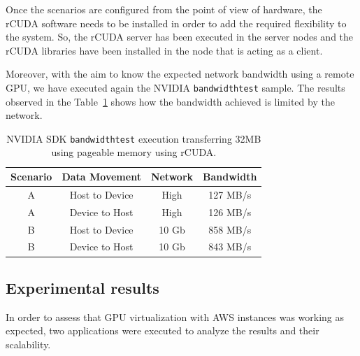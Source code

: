 \documentclass[a4paper,twoside]{article}
\begin{document}
Once the scenarios are configured from the point of view of hardware, 
the {rCUDA} software needs to be installed in order to add 
the required flexibility to the system. So, the {rCUDA} server has been 
executed in the server nodes and the {rCUDA} libraries have been installed 
in the node that is acting as a client.

Moreover, with the aim to know the expected network bandwidth using 
a remote GPU, we have executed again the NVIDIA {\tt bandwidthtest} sample.
The results observed in the Table~\ref{table:bwtrcuda} shows how the bandwidth achieved is limited 
by the network.

\begin{table}[htb]
\renewcommand{\arraystretch}{1.3}
\caption{NVIDIA SDK {\tt bandwidthtest} execution transferring 32MB using pageable memory using {rCUDA}.}
\label{table:bwtrcuda}
\tabcolsep=0.09cm
\begin{center}\begin{tabular}{cccc}
Scenario &  Data Movement & Network & Bandwidth \\ \hline \hline
A & Host to Device & High& 127 MB/s \\ \hline
A & Device to Host & High& 126 MB/s\\ \hline
B & Host to Device & 10 Gb& 858 MB/s\\ \hline
B & Device to Host & 10 Gb& 843 MB/s\\ \hline
\end{tabular}\end{center}\end{table}

\subsection{Experimental results}
In order to assess that GPU virtualization with AWS instances was working as expected, two applications were executed to analyze the results and their scalability.
\end{document}

